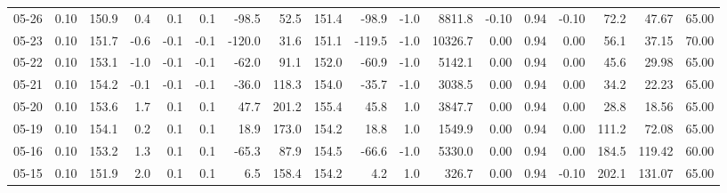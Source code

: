 \begin{threeparttable}
{\begin{tabular}{lrrrrrrrrrrrrrrrrr}
  05-26 &     0.10 & 150.9 &               0.4 &               0.1 &                0.1 &              -98.5 &   52.5 & 151.4 &      -98.9 &                     -1.0 &              8811.8 &      -0.10 &      0.94 &          -0.10 &             72.2 &           47.67 &                  65.00 \\
  05-23 &     0.10 & 151.7 &              -0.6 &              -0.1 &               -0.1 &             -120.0 &   31.6 & 151.1 &     -119.5 &                     -1.0 &             10326.7 &       0.00 &      0.94 &           0.00 &             56.1 &           37.15 &                  70.00 \\
  05-22 &     0.10 & 153.1 &              -1.0 &              -0.1 &               -0.1 &              -62.0 &   91.1 & 152.0 &      -60.9 &                     -1.0 &              5142.1 &       0.00 &      0.94 &           0.00 &             45.6 &           29.98 &                  65.00 \\
  05-21 &     0.10 & 154.2 &              -0.1 &              -0.1 &               -0.1 &              -36.0 &  118.3 & 154.0 &      -35.7 &                     -1.0 &              3038.5 &       0.00 &      0.94 &           0.00 &             34.2 &           22.23 &                  65.00 \\
  05-20 &     0.10 & 153.6 &               1.7 &               0.1 &                0.1 &               47.7 &  201.2 & 155.4 &       45.8 &                      1.0 &              3847.7 &       0.00 &      0.94 &           0.00 &             28.8 &           18.56 &                  65.00 \\
  05-19 &     0.10 & 154.1 &               0.2 &               0.1 &                0.1 &               18.9 &  173.0 & 154.2 &       18.8 &                      1.0 &              1549.9 &       0.00 &      0.94 &           0.00 &            111.2 &           72.08 &                  65.00 \\
  05-16 &     0.10 & 153.2 &               1.3 &               0.1 &                0.1 &              -65.3 &   87.9 & 154.5 &      -66.6 &                     -1.0 &              5330.0 &       0.00 &      0.94 &           0.00 &            184.5 &          119.42 &                  60.00 \\
  05-15 &     0.10 & 151.9 &               2.0 &               0.1 &                0.1 &                6.5 &  158.4 & 154.2 &        4.2 &                      1.0 &               326.7 &       0.00 &      0.94 &          -0.10 &            202.1 &          131.07 &                  65.00 \\

\end{tabular}}
\end{threeparttable}
